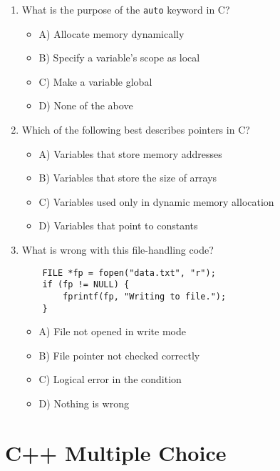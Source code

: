 \documentclass[a4paper,12pt]{article}
\begin{document}
\begin{enumerate}
    \item What is the purpose of the \verb|auto| keyword in C?
    \begin{itemize}
        \item A) Allocate memory dynamically
        \item B) Specify a variable's scope as local
        \item C) Make a variable global
        \item D) None of the above
    \end{itemize}

    \item Which of the following best describes pointers in C?
    \begin{itemize}
        \item A) Variables that store memory addresses
        \item B) Variables that store the size of arrays
        \item C) Variables used only in dynamic memory allocation
        \item D) Variables that point to constants
    \end{itemize}

    \item What is wrong with this file-handling code?

    \lstset{language=C}
    \begin{lstlisting}
    FILE *fp = fopen("data.txt", "r");
    if (fp != NULL) {
        fprintf(fp, "Writing to file.");    
    }
    \end{lstlisting}
    
    \begin{itemize}
        \item A) File not opened in write mode
        \item B) File pointer not checked correctly
        \item C) Logical error in the condition
        \item D) Nothing is wrong
    \end{itemize}

    
\end{enumerate}

\newpage

\section{C++ Multiple Choice}
\end{document}
